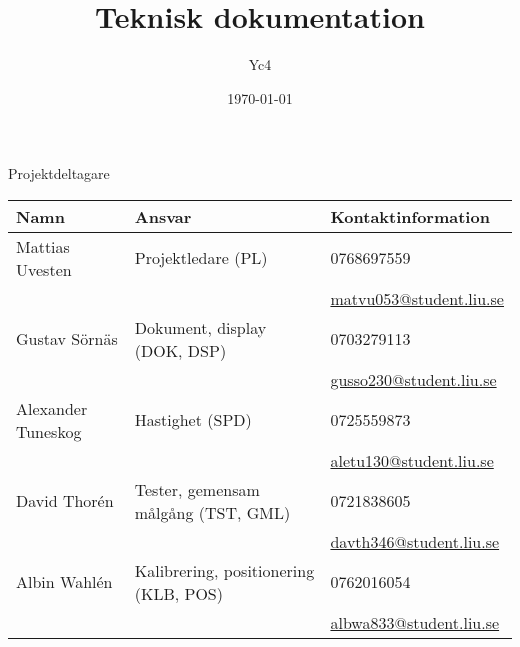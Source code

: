 \documentclass[10pt,oneside,swedish]{lips-no_customer}
\title{Teknisk dokumentation}
\author{Yc4}
\date{\today}
\begin{document}
\maketitle

\cleardoublepage
\makeprojectid

\begin{center}
  \Large Projektdeltagare
\end{center}
\begin{center}
  \begin{tabular}{|l|l|l|} \hline
    \textbf{Namn} & \textbf{Ansvar} & \textbf{Kontaktinformation }\\\hline

    Mattias Uvesten & Projektledare (PL) & 0768697559\\
    && \url{matvu053@student.liu.se} \\\hline

    Gustav Sörnäs & Dokument, display (DOK, DSP) & 0703279113\\
    && \url{gusso230@student.liu.se} \\\hline

    Alexander Tuneskog & Hastighet (SPD) & 0725559873 \\
    && \url{aletu130@student.liu.se} \\\hline

    David Thorén & Tester, gemensam målgång (TST, GML) & 0721838605 \\
    && \url{davth346@student.liu.se} \\\hline

    Albin Wahlén & Kalibrering, positionering (KLB, POS) & 0762016054 \\
    && \url{albwa833@student.liu.se} \\\hline
  \end{tabular}
\end{center}
\end{document}
